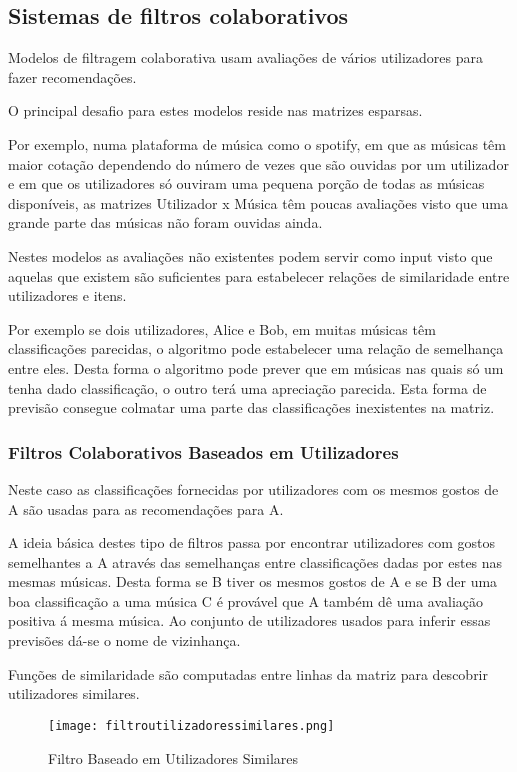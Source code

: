 \subsection{Sistemas de filtros colaborativos}
\hfill
\par Modelos de filtragem colaborativa usam avaliações de vários utilizadores para fazer recomendações.
\par O principal desafio para estes modelos reside nas matrizes esparsas.
\par Por exemplo, numa plataforma de música como o spotify, em que as músicas têm maior cotação dependendo do número de vezes que são ouvidas por um utilizador e em que os utilizadores só ouviram uma pequena porção de todas as músicas disponíveis, as matrizes Utilizador x Música têm poucas avaliações visto que uma grande parte das músicas não foram ouvidas ainda.
\par Nestes modelos as avaliações não existentes podem servir como input visto que aquelas que existem são suficientes para estabelecer relações de similaridade entre utilizadores e itens.
\par Por exemplo se dois utilizadores, Alice e Bob, em muitas músicas têm classificações parecidas, o algoritmo pode estabelecer uma relação de semelhança entre eles. Desta forma o algoritmo pode prever que em músicas nas quais só um tenha dado classificação, o outro terá uma apreciação parecida. Esta forma de previsão consegue colmatar uma parte das classificações inexistentes na matriz.


\hfill
\subsubsection{ Filtros Colaborativos Baseados em Utilizadores}
\hfill
 \par Neste caso as classificações fornecidas por utilizadores com os mesmos gostos de A são usadas para as recomendações para A. 
 \par A ideia básica destes tipo de filtros passa por encontrar utilizadores com gostos semelhantes a A através das semelhanças entre classificações dadas por estes nas mesmas músicas. Desta forma se B tiver os mesmos gostos de A e se B der uma boa classificação a uma música C é provável que A também dê uma avaliação positiva á mesma música. Ao conjunto de utilizadores usados para inferir essas previsões dá-se o nome de vizinhança.
 \par Funções de similaridade são computadas entre linhas da matriz para descobrir utilizadores similares.\newline
\hfill
\begin{figure}[H]
  \centering
  \texttt{[image: filtroutilizadoressimilares.png]}
  \caption {Filtro Baseado em Utilizadores Similares}
  \label {fig01}
\end{figure}

